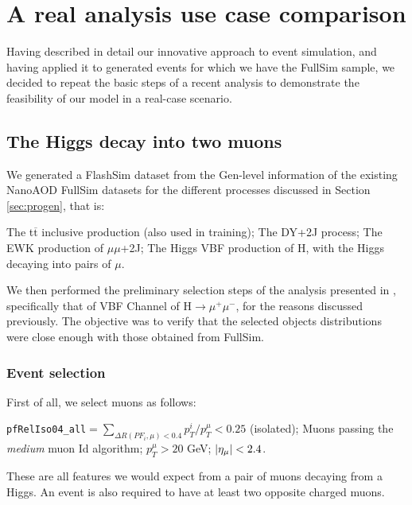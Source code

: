 \chapter{A real analysis use case comparison}\label{ch:benan} %
Having described in detail our innovative approach to event simulation, and having applied it to generated events for which we have the FullSim sample, we decided to repeat the basic steps of a recent analysis to demonstrate the feasibility of our model in a real-case scenario.

\section{The Higgs decay into two muons}
We generated a FlashSim dataset from the Gen-level information of the existing NanoAOD FullSim datasets for the different processes discussed in Section \ref{sec:progen}, that is:

\begin{outline}
\1 The t$\overline{\text{t}}$ inclusive production (also used in training);
\1 The DY+2J process;
\1 The EWK production of $\mu\mu$+2J;
\1 The Higgs VBF production of H, with the Higgs decaying into pairs of $\mu$.
\end{outline}

We then performed the preliminary selection steps of the analysis presented in \cite{Sirunyan_2021}, specifically that of VBF Channel of H$\rightarrow\mu^+\mu^-$, for the reasons discussed previously.
The objective was to verify that the selected objects distributions were close enough with those obtained from FullSim.

\subsection{Event selection}

First of all, we select muons as follows:
\begin{outline}
\1 \texttt{pfRelIso04\_all}$= \sum_{\Delta R(PF_i, \mu)<0.4}p_T^i/p_T^{\mu}<0.25$ (isolated);
\1  Muons passing the \emph{medium} muon Id algorithm;
\1  $p_T^{\mu}>20$ GeV;
\1  $\abs{\eta_{\mu}}<2.4$.
\end{outline}

These are all features we would expect from a pair of muons decaying from a Higgs. An event is also required to have at least two opposite charged muons.

